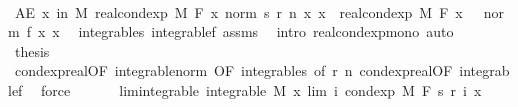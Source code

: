 \begin{isabellebody}
\ \ \ \ \isamarkupfalse%
\ \isamarkupfalse%
\ {\isachardoublequoteopen}AE\ x\ in\ M{\isachardot}{\kern0pt}\ real{\isacharunderscore}{\kern0pt}cond{\isacharunderscore}{\kern0pt}exp\ M\ F\ {\isacharparenleft}{\kern0pt}{\isasymlambda}x{\isachardot}{\kern0pt}\ norm\ {\isacharparenleft}{\kern0pt}s\ {\isacharparenleft}{\kern0pt}r\ n{\isacharparenright}{\kern0pt}\ x{\isacharparenright}{\kern0pt}{\isacharparenright}{\kern0pt}\ x\ {\isasymle}\ real{\isacharunderscore}{\kern0pt}cond{\isacharunderscore}{\kern0pt}exp\ M\ F\ {\isacharparenleft}{\kern0pt}{\isasymlambda}x{\isachardot}{\kern0pt}\ {}\ {\isacharasterisk}{\kern0pt}\ norm\ {\isacharparenleft}{\kern0pt}f\ x{\isacharparenright}{\kern0pt}{\isacharparenright}{\kern0pt}\ x{\isachardoublequoteclose}\ \isamarkupfalse%
\ integrable{\isacharunderscore}{\kern0pt}s\ integrable{\isacharunderscore}{\kern0pt}{}f\ assms{\isacharparenleft}{\kern0pt}{}{\isacharparenright}{\kern0pt}\ \isamarkupfalse%
\ {\isacharparenleft}{\kern0pt}intro\ real{\isacharunderscore}{\kern0pt}cond{\isacharunderscore}{\kern0pt}exp{\isacharunderscore}{\kern0pt}mono{\isacharcomma}{\kern0pt}\ auto{\isacharparenright}{\kern0pt}\ \isanewline
\ \ \ \ \isamarkupfalse%
\ \isamarkupfalse%
\ {\isacharquery}{\kern0pt}thesis\ \isamarkupfalse%
\ cond{\isacharunderscore}{\kern0pt}exp{\isacharunderscore}{\kern0pt}real{\isacharbrackleft}{\kern0pt}OF\ integrable{\isacharunderscore}{\kern0pt}norm{\isacharcomma}{\kern0pt}\ OF\ integrable{\isacharunderscore}{\kern0pt}s{\isacharcomma}{\kern0pt}\ of\ {\isachardoublequoteopen}r\ n{\isachardoublequoteclose}{\isacharbrackright}{\kern0pt}\ cond{\isacharunderscore}{\kern0pt}exp{\isacharunderscore}{\kern0pt}real{\isacharbrackleft}{\kern0pt}OF\ integrable{\isacharunderscore}{\kern0pt}{}f{\isacharbrackright}{\kern0pt}\ \isamarkupfalse%
\ force\isanewline
\ \ \isamarkupfalse%
\isanewline
\ \ \isamarkupfalse%
\ lim{\isacharunderscore}{\kern0pt}integrable{\isacharcolon}{\kern0pt}\ {\isachardoublequoteopen}integrable\ M\ {\isacharparenleft}{\kern0pt}{\isasymlambda}x{\isachardot}{\kern0pt}\ lim\ {\isacharparenleft}{\kern0pt}{\isasymlambda}i{\isachardot}{\kern0pt}\ cond{\isacharunderscore}{\kern0pt}exp\ M\ F\ {\isacharparenleft}{\kern0pt}s\ {\isacharparenleft}{\kern0pt}r\ i{\isacharparenright}{\kern0pt}{\isacharparenright}{\kern0pt}\ x{\isacharparenright}{\kern0pt}{\isacharparenright}{\kern0pt}{\isachardoublequoteclose}\ \isamarkupfalse%

\end{isabellebody}
